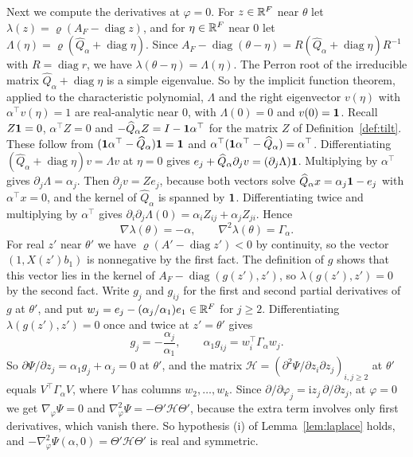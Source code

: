 Next we compute the derivatives at $\varphi=0$. For $z\in\mathbb{R}^F$ near $\theta$
let $\lambda(z)=\varrho(A_F-\operatorname{diag}z)$, and for $\eta\in\mathbb{R}^F$ near
$0$ let $\Lambda(\eta)=\varrho(\widehat Q_\alpha+\operatorname{diag}\eta)$.
Since $A_F-\operatorname{diag}(\theta-\eta)
=R(\widehat Q_\alpha+\operatorname{diag}\eta)R^{-1}$ with
$R=\operatorname{diag}r$, we have $\lambda(\theta-\eta)=\Lambda(\eta)$. The
Perron root of the irreducible matrix $\widehat Q_\alpha+\operatorname{diag}\eta$
is a simple eigenvalue. So by the implicit function theorem, applied to the
characteristic polynomial, $\Lambda$ and the right eigenvector $v(\eta)$ with
$\alpha^\top v(\eta)=1$ are real-analytic near $0$, with $\Lambda(0)=0$ and
$v(0)=\mathbf{1}$. Recall $Z\mathbf{1}=0$, $\alpha^\top Z=0$ and
$-\widehat Q_\alpha Z=I-\mathbf{1}\alpha^\top$ for the matrix $Z$ of
Definition~\ref{def:tilt}. These follow from
$(\mathbf{1}\alpha^\top-\widehat Q_\alpha)\mathbf{1}=\mathbf{1}$ and
$\alpha^\top(\mathbf{1}\alpha^\top-\widehat Q_\alpha)=\alpha^\top$. Differentiating
$(\widehat Q_\alpha+\operatorname{diag}\eta)v=\Lambda v$ at $\eta=0$ gives
$e_j+\widehat Q_\alpha\partial_jv=(\partial_j\Lambda)\mathbf{1}$. Multiplying by
$\alpha^\top$ gives $\partial_j\Lambda=\alpha_j$. Then $\partial_jv=Ze_j$,
because both vectors solve $\widehat Q_\alpha x=\alpha_j\mathbf{1}-e_j$ with
$\alpha^\top x=0$, and the kernel of $\widehat Q_\alpha$ is spanned by $\mathbf{1}$.
Differentiating twice and multiplying by $\alpha^\top$ gives
$\partial_i\partial_j\Lambda(0)=\alpha_iZ_{ij}+\alpha_jZ_{ji}$. Hence
\[
\nabla\lambda(\theta)=-\alpha,\qquad\nabla^2\lambda(\theta)=\Gamma_\alpha .
\]
For real $z'$ near $\theta'$ we have $\varrho(A'-\operatorname{diag}z')<0$ by
continuity, so the vector $(1,X(z')b_1)$ is nonnegative by the first fact. The
definition of $g$ shows that this vector lies in the kernel of
$A_F-\operatorname{diag}(g(z'),z')$, so $\lambda(g(z'),z')=0$ by the second
fact. Write $g_j$ and $g_{ij}$ for the first and second
partial derivatives of $g$ at $\theta'$, and put
$w_j=e_j-(\alpha_j/\alpha_1)e_1\in\mathbb{R}^F$ for $j\ge2$. Differentiating
$\lambda(g(z'),z')=0$ once and twice at $z'=\theta'$ gives
\[
g_j=-\frac{\alpha_j}{\alpha_1},\qquad
\alpha_1g_{ij}=w_i^\top\Gamma_\alpha w_j .
\]
So $\partial\Psi/\partial z_j=\alpha_1g_j+\alpha_j=0$ at $\theta'$, and the
matrix $\mathcal H=(\partial^2\Psi/\partial z_i\partial z_j)_{i,j\ge2}$ at
$\theta'$ equals $V^\top\Gamma_\alpha V$, where $V$ has columns
$w_2,\dots,w_k$. Since $\partial/\partial\varphi_j=\mathrm iz_j\,\partial/\partial z_j$,
at $\varphi=0$ we get $\nabla_\varphi\Psi=0$ and
$\nabla_\varphi^2\Psi=-\Theta'\mathcal H\Theta'$, because the extra term
involves only first derivatives, which vanish there. So hypothesis (i) of
Lemma~\ref{lem:laplace} holds, and $-\nabla^2_\varphi\Psi(\alpha,0)=\Theta'\mathcal H\Theta'$
is real and symmetric.

